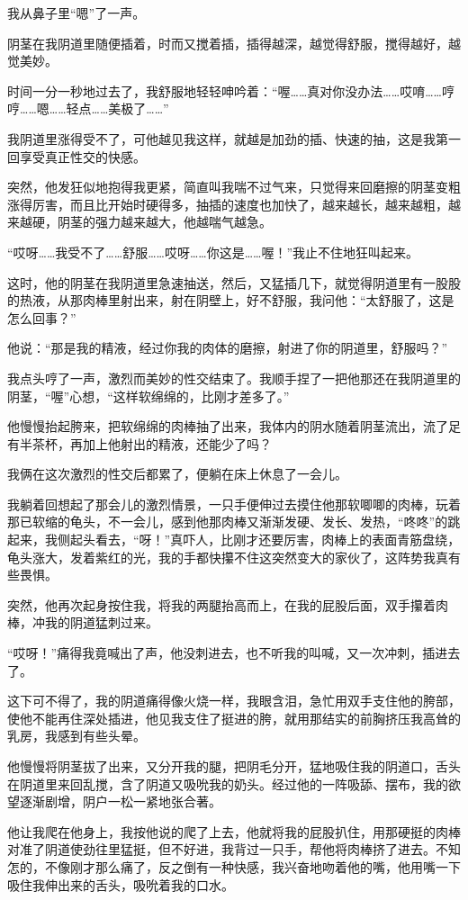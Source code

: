 \documentclass[12pt,UTF8]{ctexbook}
\begin{document}
我从鼻子里“嗯”了一声。

阴茎在我阴道里随便插着，时而又搅着插，插得越深，越觉得舒服，搅得越好，越觉美妙。

时间一分一秒地过去了，我舒服地轻轻呻吟着：“喔……真对你没办法……哎唷……哼哼……嗯……轻点……美极了……”

我阴道里涨得受不了，可他越见我这样，就越是加劲的插、快速的抽，这是我第一回享受真正性交的快感。

突然，他发狂似地抱得我更紧，简直叫我喘不过气来，只觉得来回磨擦的阴茎变粗涨得厉害，而且比开始时硬得多，抽插的速度也加快了，越来越长，越来越粗，越来越硬，阴茎的强力越来越大，他越喘气越急。

“哎呀……我受不了……舒服……哎呀……你这是……喔！”我止不住地狂叫起来。

这时，他的阴茎在我阴道里急速抽送，然后，又猛插几下，就觉得阴道里有一股股的热液，从那肉棒里射出来，射在阴壁上，好不舒服，我问他：“太舒服了，这是怎么回事？”

他说：“那是我的精液，经过你我的肉体的磨擦，射进了你的阴道里，舒服吗？”

我点头哼了一声，激烈而美妙的性交结束了。我顺手捏了一把他那还在我阴道里的阴茎，“喔”心想，“这样软绵绵的，比刚才差多了。”

他慢慢抬起胯来，把软绵绵的肉棒抽了出来，我体内的阴水随着阴茎流出，流了足有半茶杯，再加上他射出的精液，还能少了吗？

我俩在这次激烈的性交后都累了，便躺在床上休息了一会儿。

我躺着回想起了那会儿的激烈情景，一只手便伸过去摸住他那软唧唧的肉棒，玩着那已软缩的龟头，不一会儿，感到他那肉棒又渐渐发硬、发长、发热，“咚咚”的跳起来，我侧起头看去，“呀！”真吓人，比刚才还要厉害，肉棒上的表面青筋盘绕，龟头涨大，发着紫红的光，我的手都快攥不住这突然变大的家伙了，这阵势我真有些畏惧。

突然，他再次起身按住我，将我的两腿抬高而上，在我的屁股后面，双手攥着肉棒，冲我的阴道猛刺过来。

“哎呀！”痛得我竟喊出了声，他没刺进去，也不听我的叫喊，又一次冲刺，插进去了。

这下可不得了，我的阴道痛得像火烧一样，我眼含泪，急忙用双手支住他的胯部，使他不能再住深处插进，他见我支住了挺进的胯，就用那结实的前胸挤压我高耸的乳房，我感到有些头晕。

他慢慢将阴茎拔了出来，又分开我的腿，把阴毛分开，猛地吸住我的阴道口，舌头在阴道里来回乱搅，含了阴道又吸吮我的奶头。经过他的一阵吸舔、摆布，我的欲望逐渐剧增，阴户一松一紧地张合著。

他让我爬在他身上，我按他说的爬了上去，他就将我的屁股扒住，用那硬挺的肉棒对准了阴道使劲往里猛挺，但不好进，我背过一只手，帮他将肉棒挤了进去。不知怎的，不像刚才那么痛了，反之倒有一种快感，我兴奋地吻着他的嘴，他用嘴一下吸住我伸出来的舌头，吸吮着我的口水。
\end{document}
